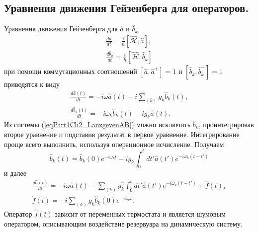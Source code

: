 \subsection{Уравнения движения Гейзенберга для операторов.}
Уравнения движения Гейзенберга для $\hat{a}$ и $\hat{b}_{k}$
\begin{eqnarray}
\frac{d \hat{a}}{d t} = \frac{i}{\hbar}\left[
 \hat{\mathcal{H}}, \hat{a}
\right],
\nonumber \\
\frac{d \hat{b}_k}{d t} = \frac{i}{\hbar}\left[
 \hat{\mathcal{H}}, \hat{b}_k
\right]
\nonumber
\end{eqnarray}
при помощи коммутационных соотношений 
$\left[\hat{a}, \hat{a}^{+}\right] = 1$ и 
$\left[\hat{b}_k, \hat{b}_{k}^{+}\right] = 1$ приводятся к виду
\begin{eqnarray}
\frac{d \hat{a}\left(t\right)}{d t} = -i \omega \hat{a}\left(t\right) - i\sum_{(k)}g_k
\hat{b}_k\left(t\right),
\nonumber \\
\frac{d \hat{b}_k\left(t\right)}{d t} = -i \omega_k
\hat{b}_{k}\left(t\right) - i g_k \hat{a}\left(t\right).
\label{eqPart1Ch2_LanzgevenAB}
\end{eqnarray}
Из системы (\ref{eqPart1Ch2_LanzgevenAB}) можно исключить $\hat{b}_k$,
проинтегрировав второе уравнение и подставив результат в первое
уравнение. Интегрирование проще всего выполнить, используя операционное
исчисление. Получаем
\begin{equation}
\hat{b}_k\left(t\right) = 
\hat{b}_k\left(0\right) e^{-i \omega_k t} 
- i g_k \int_0^t d t' \hat{a}\left(t'\right)e^{-i \omega_k\left(t - t'\right)}
\nonumber
\end{equation}
и далее
\begin{eqnarray}
\frac{d \hat{a}\left(t\right)}{dt} = 
- i \omega \hat{a}\left(t\right) - \sum_{(k)} g_k^2 \int_0^t
d t'  \hat{a}\left(t'\right)e^{-i \omega_k\left(t - t'\right)}
+ \hat{f}\left(t\right),
\nonumber \\
\hat{f}\left(t\right) = -i \sum_{(k)} g_k \hat{b}_k\left(0\right)
e^{-i \omega_k t}.
\label{eqPart1Ch2_LanzgevenA}
\end{eqnarray}
Оператор $\hat{f}\left(t\right)$ зависит от переменных термостата и
является шумовым оператором, описывающим воздействие резервуара на
динамическую систему.

